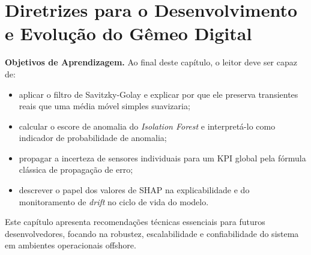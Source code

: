 \documentclass[12pt,a4paper]{article}
\numberwithin{equation}{section}
\numberwithin{table}{section}
\numberwithin{figure}{section}
\begin{document}
{	\clearpage
	\section{Diretrizes para o Desenvolvimento e Evolução do Gêmeo Digital}

	\textbf{Objetivos de Aprendizagem.} Ao final deste capítulo, o leitor
	deve ser capaz de:
	\begin{itemize}
		\item aplicar o filtro de Savitzky-Golay e explicar por que ele
		preserva transientes reais que uma média móvel simples
		suavizaria;
		\item calcular o escore de anomalia do \textit{Isolation Forest}
		e interpretá-lo como indicador de probabilidade de anomalia;
		\item propagar a incerteza de sensores individuais para um KPI
		global pela fórmula clássica de propagação de erro;
		\item descrever o papel dos valores de SHAP na explicabilidade e
		do monitoramento de \textit{drift} no ciclo de vida do modelo.
	\end{itemize}

	Este capítulo apresenta recomendações técnicas essenciais para futuros desenvolvedores, focando na robustez, escalabilidade e confiabilidade do sistema em ambientes operacionais offshore.
	
}
\end{document}
